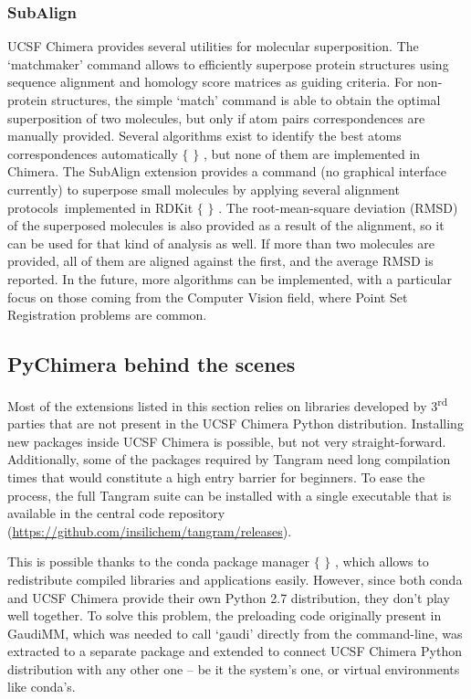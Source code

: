 \subsubsection{SubAlign}
UCSF Chimera provides several utilities for molecular superposition. The ‘matchmaker’ command allows to efficiently superpose protein structures using sequence alignment and homology score matrices as guiding criteria. For non-protein structures, the simple ‘match’ command is able to obtain the optimal superposition of two molecules, but only if atom pairs correspondences are manually provided. Several algorithms exist to identify the best atoms correspondences automatically $ \{ $ $ \} $ , but none of them are implemented in Chimera. The SubAlign extension provides a command (no graphical interface currently) to superpose small molecules by applying several alignment protocols\ implemented in RDKit $ \{ $ $ \} $ . The root-mean-square deviation (RMSD) of the superposed molecules is also provided as a result of the alignment, so it can be used for that kind of analysis as well. If more than two molecules are provided, all of them are aligned against the first, and the average RMSD is reported. In the future, more algorithms can be implemented, with a particular focus on those coming from the Computer Vision field, where Point Set Registration problems are common.

\subsection{PyChimera behind the scenes}


Most of the extensions listed in this section relies on libraries developed by 3\textsuperscript{rd} parties that are not present in the UCSF Chimera Python distribution. Installing new packages inside UCSF Chimera is possible, but not very straight-forward. Additionally, some of the packages required by Tangram need long compilation times that would constitute a high entry barrier for beginners. To ease the process, the full Tangram suite can be installed with a single executable that is available in the central code repository (\href{https://github.com/insilichem/tangram/releases}{https://github.com/insilichem/tangram/releases}).

This is possible thanks to the conda package manager $ \{ $ $ \} $ , which allows to redistribute compiled libraries and applications easily. However, since both conda and UCSF Chimera provide their own Python 2.7 distribution, they don’t play well together. To solve this problem, the preloading code originally present in GaudiMM, which was needed to call ‘gaudi’ directly from the command-line, was extracted to a separate package and extended to connect UCSF Chimera Python distribution with any other one – be it the system’s one, or virtual environments like conda’s.

